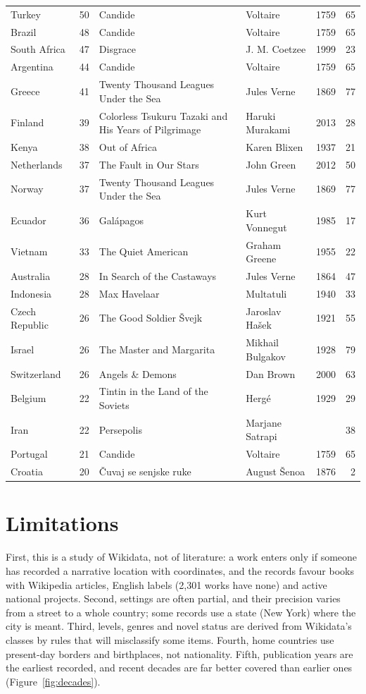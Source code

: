 \documentclass[11pt,a4paper]{article}
\begin{document}
{\begin{longtable}{lrp{5.2cm}p{3.6cm}rr}
Turkey & 50 & Candide & Voltaire & 1759 & 65\\
Brazil & 48 & Candide & Voltaire & 1759 & 65\\
South Africa & 47 & Disgrace & J. M. Coetzee & 1999 & 23\\
Argentina & 44 & Candide & Voltaire & 1759 & 65\\
Greece & 41 & Twenty Thousand Leagues Under the Sea & Jules Verne & 1869 & 77\\
Finland & 39 & Colorless Tsukuru Tazaki and His Years of Pilgrimage & Haruki Murakami & 2013 & 28\\
Kenya & 38 & Out of Africa & Karen Blixen & 1937 & 21\\
Netherlands & 37 & The Fault in Our Stars & John Green & 2012 & 50\\
Norway & 37 & Twenty Thousand Leagues Under the Sea & Jules Verne & 1869 & 77\\
Ecuador & 36 & Galápagos & Kurt Vonnegut & 1985 & 17\\
Vietnam & 33 & The Quiet American & Graham Greene & 1955 & 22\\
Australia & 28 & In Search of the Castaways & Jules Verne & 1864 & 47\\
Indonesia & 28 & Max Havelaar & Multatuli & 1940 & 33\\
Czech Republic & 26 & The Good Soldier Švejk & Jaroslav Hašek & 1921 & 55\\
Israel & 26 & The Master and Margarita & Mikhail Bulgakov & 1928 & 79\\
Switzerland & 26 & Angels \& Demons & Dan Brown & 2000 & 63\\
Belgium & 22 & Tintin in the Land of the Soviets & Hergé & 1929 & 29\\
Iran & 22 & Persepolis & Marjane Satrapi &  & 38\\
Portugal & 21 & Candide & Voltaire & 1759 & 65\\
Croatia & 20 & Čuvaj se senjske ruke & August Šenoa & 1876 & 2\\
\bottomrule\end{longtable}}

\section{Limitations}
First, this is a study of Wikidata, not of literature: a work enters only if someone has recorded a narrative location with coordinates, and the records favour books with Wikipedia articles, English labels (2,301 works have none) and active national projects. Second, settings are often partial, and their precision varies from a street to a whole country; some records use a state (New York) where the city is meant. Third, levels, genres and novel status are derived from Wikidata's classes by rules that will misclassify some items. Fourth, home countries use present-day borders and birthplaces, not nationality. Fifth, publication years are the earliest recorded, and recent decades are far better covered than earlier ones (Figure~\ref{fig:decades}).
\end{document}
